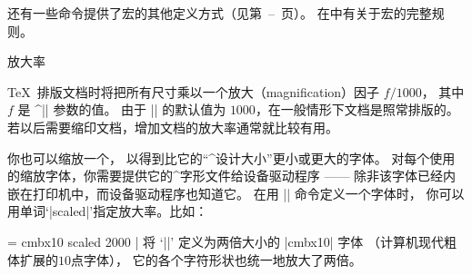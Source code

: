 {{{{{{{{{{{%
还有一些命令提供了宏的其他定义方式（见第~--~页）。
在中有关于宏的完整规则。
}%
\endconcept


\concept 放大率

\TeX\ 排版文档时将把所有尺寸乘以一个放大（magnification）因子 $f/1000$，
其中 $f$ 是 ^|\mag| 参数\ctsref\mag 的值。
由于 |\mag| 的默认值为 $1000$，在一般情形下文档是照常排版的。
若以后需要缩印文档，增加文档的放大率通常就比较有用。

你也可以缩放一个，
以得到比它的“^{设计大小}”更小或更大的字体。
对每个使用的缩放字体，你需要提供它的^{字形文件}给设备驱动程序%
——
除非该字体已经内嵌在打印机中，而设备驱动程序也知道它。
在用 |\font| 命令\ctsref{\font}定义一个字体时，
你可以用单词‘|scaled|’指定放大率。比如：

\csdisplay
\font\largerbold = cmbx10 scaled 2000
|
将 `|\largerbold|' 定义为两倍大小的 |cmbx10| 字体%
（计算机现代粗体扩展的$10$点字体），
它的各个字符形状也统一地放大了两倍。

}}}}}}}}}}
